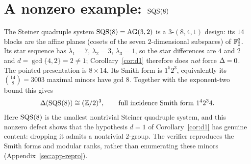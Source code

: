 \section{A nonzero example: \texorpdfstring{$\mathrm{SQS}(8)$}{SQS(8)}}\label{sec:app-sqs}

The Steiner quadruple system $\mathrm{SQS}(8)=\mathrm{AG}(3,2)$ is a $3$-$(8,4,1)$ design: its
$14$ blocks are the affine planes (cosets of the seven $2$-dimensional
subspaces) of $\mathbb{F}_2^{3}$. Its star sequence has $\lambda_1=7$, $\lambda_2=3$,
$\lambda_3=1$, so the star differences are $4$ and $2$ and
$d=\gcd\{4,2\}=2\neq1$; Corollary~\ref{cor:d1} therefore does \emph{not} force
$\Delta=0$. The pointed presentation is $8\times14$. Its Smith form is
$1^5 2^3$, equivalently its $\binom{14}{8}=3003$ maximal minors have gcd $8$.
Together with the exponent-two bound this gives
\[
\Delta(\mathrm{SQS}(8))\cong(\mathbb{Z}/2)^{3},\qquad\text{full incidence Smith form } 1^{4}2^{3}4 .
\]
Here $\mathrm{SQS}(8)$ is the smallest nontrivial Steiner quadruple system, and this
nonzero defect shows that the hypothesis $d=1$ of Corollary~\ref{cor:d1} has
genuine content: dropping it admits a nontrivial $2$-group. The verifier
reproduces the Smith forms and modular ranks, rather than enumerating these
minors (Appendix~\ref{sec:app-repro}).
